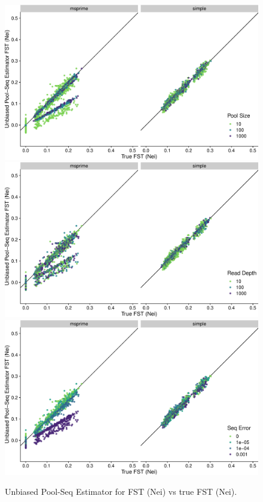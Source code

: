 \documentclass[letterpaper,fontsize=9pt,DIV=12]{scrartcl}
\begin{document}
\begin{figure}[p]
    \centering
    \includegraphics[width=.69\linewidth]{true_nei_fst-est_spence_nei-pool_size.pdf}
    \includegraphics[width=.69\linewidth]{true_nei_fst-est_spence_nei-read_depth.pdf}
    \includegraphics[width=.69\linewidth]{true_nei_fst-est_spence_nei-seq_error.pdf}
    \vspace*{-1em}
    \caption{
        Unbiased Pool-Seq Estimator for FST (Nei) vs true FST (Nei).
    }
\label{fig:UnbiasedNei}
\end{figure}
\end{document}
